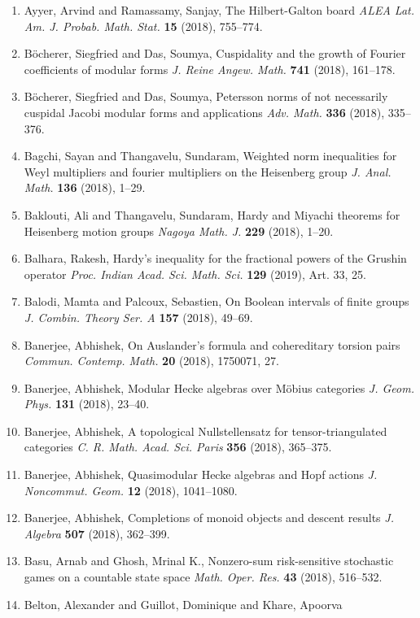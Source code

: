 \begin{enumerate}
\item Ayyer, Arvind and Ramassamy, Sanjay, The {H}ilbert-{G}alton board {\em ALEA Lat. Am. J. Probab. Math. Stat.} {\bf 15} (2018), 755--774.
\item B\"{o}cherer, Siegfried and Das, Soumya, Cuspidality and the growth of {F}ourier coefficients of
modular forms {\em J. Reine Angew. Math.} {\bf 741} (2018), 161--178.
\item B\"{o}cherer, Siegfried and Das, Soumya, Petersson norms of not necessarily cuspidal {J}acobi modular
forms and applications {\em Adv. Math.} {\bf 336} (2018), 335--376.
\item Bagchi, Sayan and Thangavelu, Sundaram, Weighted norm inequalities for {W}eyl multipliers and fourier
multipliers on the {H}eisenberg group {\em J. Anal. Math.} {\bf 136} (2018), 1--29.
\item Baklouti, Ali and Thangavelu, Sundaram, Hardy and {M}iyachi theorems for {H}eisenberg motion groups {\em Nagoya Math. J.} {\bf 229} (2018), 1--20.
\item Balhara, Rakesh, Hardy's inequality for the fractional powers of the {G}rushin
operator {\em Proc. Indian Acad. Sci. Math. Sci.} {\bf 129} (2019), Art. 33, 25.
\item Balodi, Mamta and Palcoux, Sebastien, On {B}oolean intervals of finite groups {\em J. Combin. Theory Ser. A} {\bf 157} (2018), 49--69.
\item Banerjee, Abhishek, On {A}uslander's formula and cohereditary torsion pairs {\em Commun. Contemp. Math.} {\bf 20} (2018), 1750071, 27.
\item Banerjee, Abhishek, Modular {H}ecke algebras over {M}\"{o}bius categories {\em J. Geom. Phys.} {\bf 131} (2018), 23--40.
\item Banerjee, Abhishek, A topological {N}ullstellensatz for tensor-triangulated
categories {\em C. R. Math. Acad. Sci. Paris} {\bf 356} (2018), 365--375.
\item Banerjee, Abhishek, Quasimodular {H}ecke algebras and {H}opf actions {\em J. Noncommut. Geom.} {\bf 12} (2018), 1041--1080.
\item Banerjee, Abhishek, Completions of monoid objects and descent results {\em J. Algebra} {\bf 507} (2018), 362--399.
\item Basu, Arnab and Ghosh, Mrinal K., Nonzero-sum risk-sensitive stochastic games on a countable
state space {\em Math. Oper. Res.} {\bf 43} (2018), 516--532.
\item Belton, Alexander and Guillot, Dominique and Khare, Apoorva

\end{enumerate}
